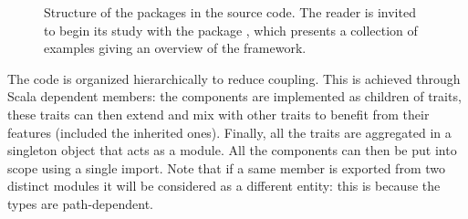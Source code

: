 \begin{figure}[H]
  \centering
  \caption[Source code packages structure]{Structure of the packages in the source code. The reader is invited to begin its study with the package , which presents a collection of examples giving an overview of the framework.}
  \label{fig:packages}
\end{figure}

The code is organized hierarchically to reduce coupling. This is achieved through Scala dependent members: the components are implemented as children of traits, these traits can then extend and mix with other traits to benefit from their features (included the inherited ones). Finally, all the traits are aggregated in a singleton object that acts as a module. All the components can then be put into scope using a single import. Note that if a same member is exported from two distinct modules it will be considered as a different entity: this is because the types are path-dependent.

